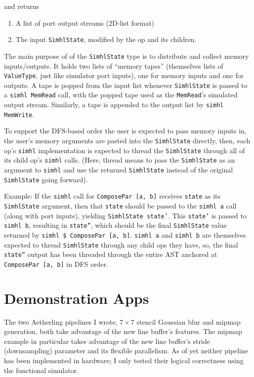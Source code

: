 \documentclass[12pt]{article}
\begin{document}
and returns

\begin{enumerate}
\item A list of port output streams (2D-list format)
\item The input \texttt{SimhlState}, modified by the op and its children.
\end{enumerate}

The main purpose of of the \texttt{SimhlState} type is to distribute
and collect memory inputs/outputs. It holds two lists of ``memory
tapes'' (themselves lists of \texttt{ValueType}, just like simulator
port inputs), one for memory inputs and one for outputs. A tape is
popped from the input list whenever \texttt{SimhlState} is passed to a
\texttt{simhl MemRead} call, with the popped tape used as the
\texttt{MemRead}'s simulated output stream. Similarly, a tape is appended to
the output list by \texttt{simhl MemWrite}.

To support the DFS-based order the user is expected to pass memory
inputs in, the user's memory arguments are pasted into the
\texttt{SimhlState} directly, then, each op's \texttt{simhl}
implementation is expected to thread the \texttt{SimhlState}
through all of its child op's \texttt{simhl} calls. (Here,
thread means to pass the \texttt{SimhlState} as an argument to
\texttt{simhl} and use the returned \texttt{SimhlState} instead
of the original \texttt{SimhlState} going forward).

Example: If the \texttt{simhl} call for \texttt{ComposePar [a, b]}
receives \texttt{state} as its \texttt{SimhlState} argument, then that
\texttt{state} should be passed to the \texttt{simhl a} call (along
with port inputs), yielding \texttt{SimhlState state'}. This
\texttt{state'} is passed to \texttt{simhl b}, resulting in
\texttt{state''}, which should be the final \texttt{SimhlState} value
returned by \texttt{simhl \$ ComposePar [a, b]}. \texttt{simhl a} and
\texttt{simhl b} are themselves expected to thread \texttt{SimhlState}
through any child ops they have, so, the final \texttt{state''} output
has been threaded through the entire AST anchored at
\texttt{ComposePar [a, b]} in DFS order.

\section{Demonstration Apps}

The two Aetherling pipelines I wrote, $7 \times 7$ stencil Gaussian
blur and mipmap generation, both take advantage of the new line
buffer's features. The mipmap example in particular takes advantage of
the new line buffer's stride (downsampling) parameter and its flexible
parallelism. As of yet neither pipeline has been implemented in
hardware; I only tested their logical correctness using the functional
simulator.
\end{document}
